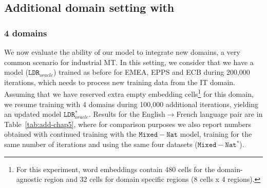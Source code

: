 \begin{table}[!h]
\begin{center}
\end{center}
\caption{BLEU scores for the Transformer architecture for varying domain-specific embedding sizes \label{tab:embedding-size-chap5}}
\end{table}

\subsection{Additional domain setting with  \label{ssec:additional_domain-chap5}}
\subsubsection{4 domains}
We now evaluate the ability of our model to integrate new domains, a very common scenario for industrial MT. In this setting, we consider that we have a model ($\mathtt{LDR}_{oracle}$) trained as before for EMEA, EPPS and ECB during 200,000 iterations, which needs to process new training data from the IT domain. Assuming that we have reserved extra empty embedding cells\footnote{For this experiment, word embeddings contain 480 cells for the domain-agnostic region and 32 cells for domain specific regions (8 cells x 4 regions).} for this domain, we resume training with 4 domains during 100,000 additional iterations, yielding an updated model  $\mathtt{LDR}_{oracle}^*$. Results for the English$\rightarrow$French language pair are in Table~\ref{tab:add-chap5}, where for comparison purposes we also report numbers obtained with continued training with the $\mathtt{Mixed-Nat}$ model, training for the same number of iterations and using the same four datasets ($\mathtt{Mixed-Nat}^*$).

